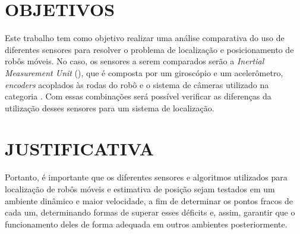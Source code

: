 \documentclass[acronym, symbols, table]{fei}
\begin{document}
	\section{OBJETIVOS}
	
		Este trabalho tem como objetivo realizar uma análise comparativa do uso de diferentes sensores para resolver o problema de localização e posicionamento de robôs móveis. No caso, os sensores a serem comparados serão a \textit{Inertial Measurement Unit} (), que é composta por um giroscópio e um acelerômetro, \textit{encoders} acoplados às rodas do robô e o sistema de câmeras utilizado na categoria . Com essas combinações será possível verificar as diferenças da utilização desses sensores para um sistema de localização.
	
%		
%		
%		
		
	\section{JUSTIFICATIVA}
	
		
		
		Portanto, é importante que os diferentes sensores e algoritmos utilizados para localização de robôs móveis e estimativa de posição sejam testados em um ambiente dinâmico e maior velocidade, a fim de determinar os pontos fracos de cada um, determinando formas de superar esses déficits e, assim, garantir que o funcionamento deles de forma adequada em outros ambientes posteriormente.
	
\end{document}
